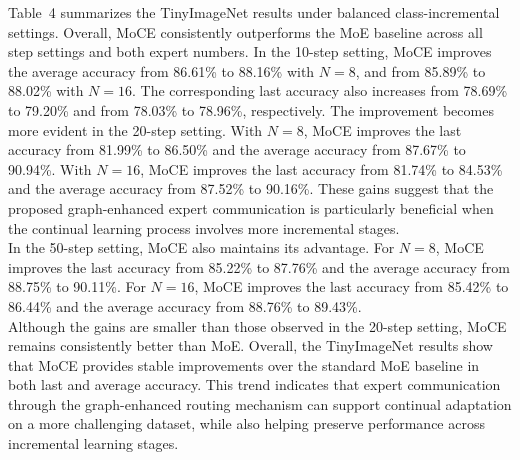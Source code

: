 \documentclass{article}
\theoremstyle{definition}
\theoremstyle{remark}
\begin{document}
Table~4 summarizes the TinyImageNet results under balanced class-incremental settings. Overall, MoCE consistently outperforms the MoE baseline across all step settings and both expert numbers.
In the 10-step setting, MoCE improves the average accuracy from 86.61\% to 88.16\% with $N=8$, and from 85.89\% to 88.02\% with $N=16$.
The corresponding last accuracy also increases from 78.69\% to 79.20\% and from 78.03\% to 78.96\%, respectively.
The improvement becomes more evident in the 20-step setting.
With $N=8$, MoCE improves the last accuracy from 81.99\% to 86.50\% and the average accuracy from 87.67\% to 90.94\%.
With $N=16$, MoCE improves the last accuracy from 81.74\% to 84.53\% and the average accuracy from 87.52\% to 90.16\%.
These gains suggest that the proposed graph-enhanced expert communication is particularly beneficial when the continual learning process involves more incremental stages.\\
In the 50-step setting, MoCE also maintains its advantage.
For $N=8$, MoCE improves the last accuracy from 85.22\% to 87.76\% and the average accuracy from 88.75\% to 90.11\%.
For $N=16$, MoCE improves the last accuracy from 85.42\% to 86.44\% and the average accuracy from 88.76\% to 89.43\%.\\
Although the gains are smaller than those observed in the 20-step setting, MoCE remains consistently better than MoE.
Overall, the TinyImageNet results show that MoCE provides stable improvements over the standard MoE baseline in both last and average accuracy.
This trend indicates that expert communication through the graph-enhanced routing mechanism can support continual adaptation on a more challenging dataset, while also helping preserve performance across incremental learning stages.
\end{document}
